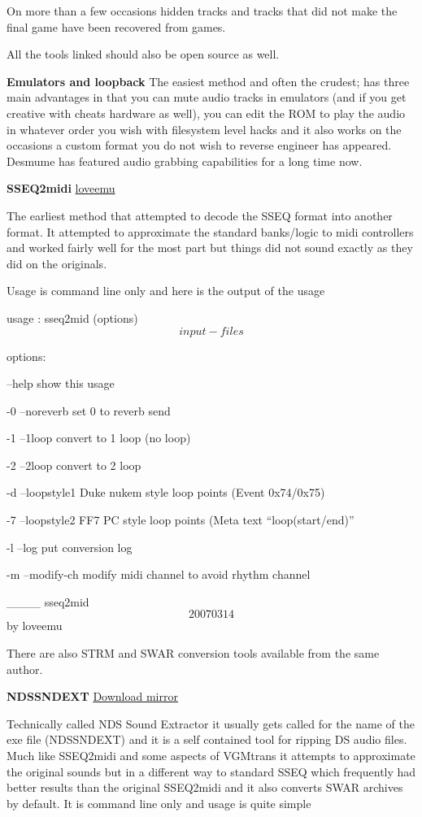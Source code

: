 \documentclass[
]{book}
\begin{document}
On more than a few occasions hidden tracks and tracks that did not make the final game have been recovered from games.

All the tools linked should also be open source as well.

\textbf{Emulators and loopback} The easiest method and often the crudest; has three main advantages in that you can mute audio tracks in emulators (and if you get creative with cheats hardware as well), you can edit the ROM to play the audio in whatever order you wish with filesystem level hacks and it also works on the occasions a custom format you do not wish to reverse engineer has appeared. Desmume has featured audio grabbing capabilities for a long time now.

\textbf{SSEQ2midi} \href{https://github.com/loveemu/loveemu-lab}{loveemu}

The earliest method that attempted to decode the SSEQ format into another format. It attempted to approximate the standard banks/logic to midi controllers and worked fairly well for the most part but things did not sound exactly as they did on the originals.

Usage is command line only and here is the output of the usage

usage : sseq2mid (options) \[input-files\]

options:

--help show this usage

-0 --noreverb set 0 to reverb send

-1 --1loop convert to 1 loop (no loop)

-2 --2loop convert to 2 loop

-d --loopstyle1 Duke nukem style loop points (Event 0x74/0x75)

-7 --loopstyle2 FF7 PC style loop points (Meta text ``loop(start/end)''

-l --log put conversion log

-m --modify-ch modify midi channel to avoid rhythm channel

\_\_\_\_ sseq2mid \[20070314\] by loveemu

There are also STRM and SWAR conversion tools available from the same author.

\textbf{NDSSNDEXT} \href{http://filetrip.net/nds-downloads/utilities/latest-nds-sound-extractor-f28818.html}{Download mirror}

Technically called NDS Sound Extractor it usually gets called for the name of the exe file (NDSSNDEXT) and it is a self contained tool for ripping DS audio files. Much like SSEQ2midi and some aspects of VGMtrans it attempts to approximate the original sounds but in a different way to standard SSEQ which frequently had better results than the original SSEQ2midi and it also converts SWAR archives by default. It is command line only and usage is quite simple
\end{document}
